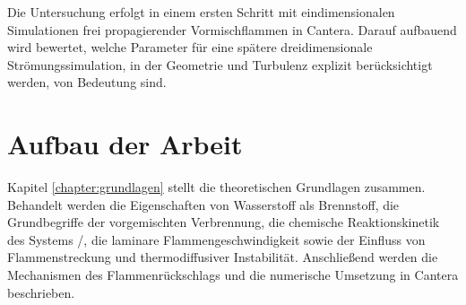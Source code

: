 Die Untersuchung erfolgt in einem ersten Schritt mit eindimensionalen
Simulationen frei propagierender Vormischflammen in Cantera. Darauf aufbauend
wird bewertet, welche Parameter für eine spätere dreidimensionale
Strömungssimulation, in der Geometrie und Turbulenz explizit berücksichtigt
werden, von Bedeutung sind.

\section{Aufbau der Arbeit}\label{sec:aufbau}

Kapitel \ref{chapter:grundlagen} stellt die theoretischen Grundlagen zusammen.
Behandelt werden die Eigenschaften von Wasserstoff als Brennstoff, die
Grundbegriffe der vorgemischten Verbrennung, die chemische Reaktionskinetik des
Systems /, die laminare Flammengeschwindigkeit sowie der Einfluss
von Flammenstreckung und thermodiffusiver Instabilität. Anschließend werden die
Mechanismen des Flammenrückschlags und die numerische Umsetzung in Cantera
beschrieben.

